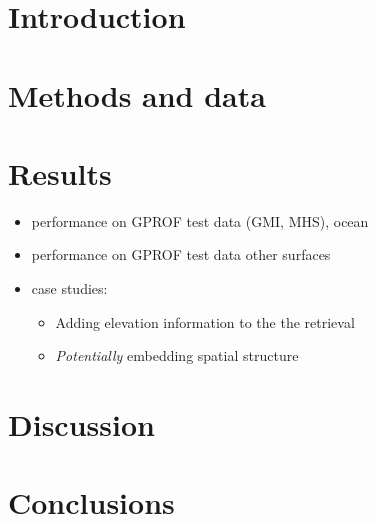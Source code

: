 \documentclass[12pt]{scrartcl}
\begin{document}
\maketitle

\section{Introduction}

\section{Methods and data}

\section{Results}

\begin{itemize}
  \item performance on GPROF test data (GMI, MHS), ocean
  \item performance on GPROF test data other surfaces
  \item case studies:
    \begin{itemize}
    \item Adding elevation information to the the retrieval
    \item \textit{Potentially} embedding spatial structure
    \end{itemize}
\end{itemize}

\section{Discussion}

\section{Conclusions}
\end{document}
